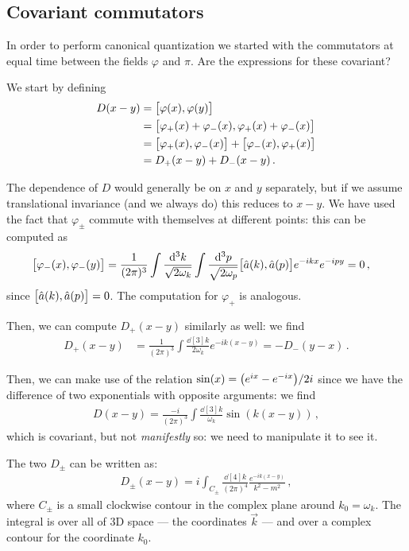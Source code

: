 \documentclass[main.tex]{subfiles}
\begin{document}
\subsection{Covariant commutators} \label{sec:covariant-commutators}

In order to perform canonical quantization we started with the commutators at equal time between the fields \(\varphi \) and \(\pi \). 
Are the expressions for these covariant? 

We start by defining 
%
\begin{align}
D(x - y) &= \qty[\varphi (x), \varphi (y)]  \\
&= \qty[\varphi_{+} (x) + \varphi_{-} (x), \varphi_{+} (x) + \varphi_{-} (x)]  \\
&= \qty[\varphi_{+} (x), \varphi_{-} (x)] + \qty[\varphi_{-} (x), \varphi_{+} (x)]  \\
&= D_+ (x-y) + D_- (x-y)
\,.
\end{align}

The dependence of \(D\) would generally be on \(x\) and \(y\) separately, but if we assume translational invariance (and we always do) this reduces to \(x-y\).
We have used the fact that \(\varphi_{\pm}\) commute with themselves at different points: this can be computed as 
%
\begin{align}
\qty[\varphi_{-}(x) , \varphi_{-}(y)] &=
\frac{1}{(2\pi )^{3}} \int \frac{ \dd[3]{k}}{\sqrt{2 \omega_{k}}}
\int \frac{\dd[3]{p}}{\sqrt{2 \omega_{p}}} 
\qty[\hat{a}(k), \hat{a}(p)] e^{-ikx} e^{-ipy} = 0
\,,
\end{align}
%
since \(\qty[\hat{a}(k), \hat{a}(p)] = 0\). The computation for \(\varphi_{+}\) is analogous. 

Then, we can compute \(D_{+} (x-y)\) similarly as well: we find 
%
\begin{align}
D_{+} (x-y) &= \frac{1}{(2\pi )^3} \int \frac{ \dd[3]{k} }{2 \omega_{k}}
e^{-ik(x-y)} = - D_{-} (y-x)  
\,.
\end{align}

Then, we can make use of the relation \(\sin(x) = \qty(e^{ix} - e^{-ix}) / 2i\) since we have the difference of two exponentials with opposite arguments: we find 
%
\begin{align}
D(x-y) = \frac{-i}{(2 \pi )^3}
\int \frac{ \dd[3]{k}}{\omega_{k}} \sin(k (x-y))
\,,
\end{align}
%
which is covariant, but not \emph{manifestly} so: we need to manipulate it to see it.

\begin{claim}
The two \(D_{\pm } \) can be written as: 
%
\begin{align}
    D_{\pm } (x-y) = i \int_{C_{\pm}} \frac{ \dd[4]{k}}{(2 \pi )^{4}} \frac{e^{-ik(x-y)}}{k^2- m^2}
    \,,
\end{align}
%
where \(C_{\pm}\) is a small clockwise contour in the complex plane around \(k_0 = \omega_{k}\). The integral is over all of 3D space --- the coordinates \(\vec{k}\) --- and over a complex contour for the coordinate \(k_0 \). 
\end{claim}
\end{document}
